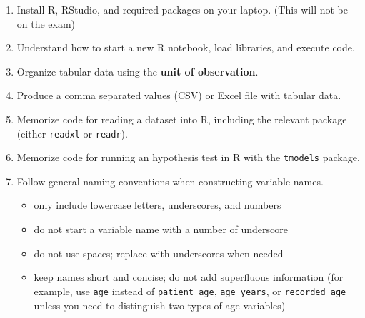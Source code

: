 \documentclass[11pt]{article}
\begin{document}
\begin{enumerate}
\item Install R, RStudio, and required packages on your laptop. (This will not
be on the exam)

\item Understand how to start a new R notebook, load libraries, and execute
code.

\item Organize tabular data using the \textbf{unit of observation}.

\item Produce a comma separated values (CSV) or Excel file with tabular data.

\item Memorize code for reading a dataset into R, including the relevant package
(either \texttt{readxl} or \texttt{readr}).

\item Memorize code for running an hypothesis test in R with the \texttt{tmodels}
package.

\item Follow general naming conventions when constructing variable names.
\begin{itemize}
\renewcommand{\labelitemi}{{\textcolor{dark}{{\tiny $\blacksquare$}}}}
\item only include lowercase letters, underscores, and numbers
\item do not start a variable name with a number of underscore
\item do not use spaces; replace with underscores when needed
\item keep names short and concise; do not add superfluous information
(for example, use \texttt{age} instead of \texttt{patient\_age},
\texttt{age\_years}, or \texttt{recorded\_age} unless you need to distinguish
two types of age variables)
\end{itemize}


\end{enumerate}
\end{document}
